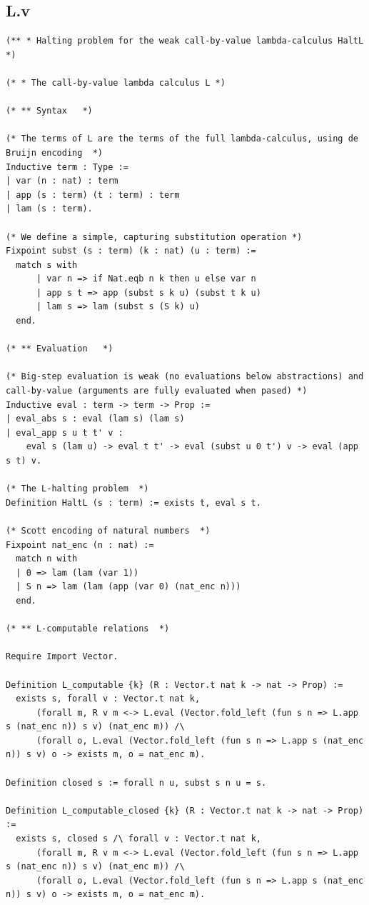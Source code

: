 \documentclass[10pt,a4paper]{amsart}
\begin{document}
\subsection*{L.v}
\begin{lstlisting}
(** * Halting problem for the weak call-by-value lambda-calculus HaltL  *)

(* * The call-by-value lambda calculus L *)

(* ** Syntax   *)

(* The terms of L are the terms of the full lambda-calculus, using de Bruijn encoding  *)
Inductive term : Type :=
| var (n : nat) : term
| app (s : term) (t : term) : term
| lam (s : term).

(* We define a simple, capturing substitution operation *)
Fixpoint subst (s : term) (k : nat) (u : term) :=
  match s with
      | var n => if Nat.eqb n k then u else var n
      | app s t => app (subst s k u) (subst t k u)
      | lam s => lam (subst s (S k) u)
  end.

(* ** Evaluation   *)

(* Big-step evaluation is weak (no evaluations below abstractions) and call-by-value (arguments are fully evaluated when pased) *)
Inductive eval : term -> term -> Prop :=
| eval_abs s : eval (lam s) (lam s)
| eval_app s u t t' v :
    eval s (lam u) -> eval t t' -> eval (subst u 0 t') v -> eval (app s t) v.

(* The L-halting problem  *)
Definition HaltL (s : term) := exists t, eval s t.

(* Scott encoding of natural numbers  *)
Fixpoint nat_enc (n : nat) := 
  match n with
  | 0 => lam (lam (var 1))
  | S n => lam (lam (app (var 0) (nat_enc n)))
  end.

(* ** L-computable relations  *)

Require Import Vector.

Definition L_computable {k} (R : Vector.t nat k -> nat -> Prop) := 
  exists s, forall v : Vector.t nat k, 
      (forall m, R v m <-> L.eval (Vector.fold_left (fun s n => L.app s (nat_enc n)) s v) (nat_enc m)) /\
      (forall o, L.eval (Vector.fold_left (fun s n => L.app s (nat_enc n)) s v) o -> exists m, o = nat_enc m).

Definition closed s := forall n u, subst s n u = s.

Definition L_computable_closed {k} (R : Vector.t nat k -> nat -> Prop) := 
  exists s, closed s /\ forall v : Vector.t nat k, 
      (forall m, R v m <-> L.eval (Vector.fold_left (fun s n => L.app s (nat_enc n)) s v) (nat_enc m)) /\
      (forall o, L.eval (Vector.fold_left (fun s n => L.app s (nat_enc n)) s v) o -> exists m, o = nat_enc m).

\end{lstlisting}
\end{document}
